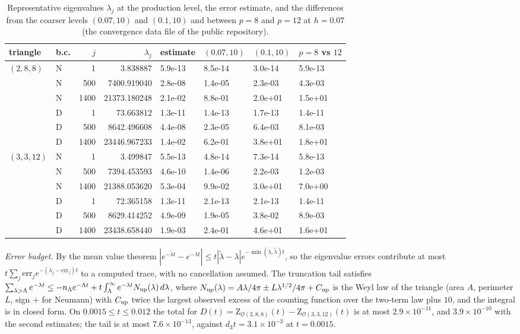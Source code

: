 \documentclass[pdflatex,sn-mathphys-num]{sn-jnl}
\newcommand{\Orb}{\mathcal{O}}
\newcommand{\cZ}{\mathrm{Z}}
\theoremstyle{thmstyleone}%
\theoremstyle{thmstylethree}%
\providecommand{\Orb}{\mathcal{O}}
\providecommand{\cZ}{\mathrm{Z}}
\begin{document}
\begin{table}[ht]
\caption{Representative eigenvalues $\lambda_j$ at the production level, the error estimate, and the differences from the coarser levels $(0.07,10)$ and $(0.1,10)$ and between $p=8$ and $p=12$ at $h=0.07$ (the convergence data file of the public repository).}\label{tab:conv}
\centering\footnotesize
\begin{tabular}{@{}llrrllll@{}}
\toprule
triangle & b.c. & $j$ & $\lambda_j$ & estimate & $(0.07,10)$ & $(0.1,10)$ & $p=8$ vs $12$\\
\midrule
$(2,8,8)$ & N & 1 & 3.838887 & 5.9e-13 & 8.5e-14 & 3.0e-14 & 5.9e-13\\
 & N & 500 & 7400.919040 & 2.8e-08 & 1.4e-05 & 2.3e-03 & 4.3e-03\\
 & N & 1400 & 21373.180248 & 2.1e-02 & 8.8e-01 & 2.0e+01 & 1.5e+01\\
 & D & 1 & 73.663812 & 1.3e-11 & 1.4e-13 & 1.7e-13 & 1.4e-11\\
 & D & 500 & 8642.496608 & 4.4e-08 & 2.3e-05 & 6.4e-03 & 8.1e-03\\
 & D & 1400 & 23446.967233 & 1.4e-02 & 6.2e-01 & 3.8e+01 & 1.8e+01\\
$(3,3,12)$ & N & 1 & 3.499847 & 5.5e-13 & 4.8e-14 & 7.3e-14 & 5.8e-13\\
 & N & 500 & 7394.453593 & 4.6e-10 & 1.4e-06 & 2.2e-03 & 1.2e-03\\
 & N & 1400 & 21388.053620 & 5.3e-04 & 9.9e-02 & 3.0e+01 & 7.0e+00\\
 & D & 1 & 72.365158 & 1.3e-11 & 2.1e-13 & 2.1e-13 & 1.4e-11\\
 & D & 500 & 8629.414252 & 4.9e-09 & 1.9e-05 & 3.8e-02 & 8.9e-03\\
 & D & 1400 & 23438.658440 & 1.9e-03 & 2.4e-01 & 4.6e+01 & 1.6e+01\\
\bottomrule
\end{tabular}
\end{table}

\emph{Error budget.} By the mean value theorem $|e^{-\tilde\lambda t}-e^{-\lambda t}|\le t|\tilde\lambda-\lambda|e^{-\min(\lambda,\tilde\lambda)t}$, so the eigenvalue errors contribute at most $t\sum_j\mathrm{err}_je^{-(\lambda_j-\mathrm{err}_j)t}$ to a computed trace, with no cancellation assumed. The truncation tail satisfies $\sum_{\lambda>\Lambda}e^{-\lambda t}\le-n_\Lambda e^{-\Lambda t}+t\int_\Lambda^\infty e^{-\lambda t}N_{\rm up}(\lambda)\,d\lambda$, where $N_{\rm up}(\lambda)=A\lambda/4\pi\pm L\lambda^{1/2}/4\pi+C_{\rm up}$ is the Weyl law of the triangle (area $A$, perimeter $L$, sign $+$ for Neumann) with $C_{\rm up}$ twice the largest observed excess of the counting function over the two-term law plus $10$, and the integral is in closed form. On $0.0015\le t\le0.012$ the total for $D(t)=\cZ_{\Orb(2,8,8)}(t)-\cZ_{\Orb(3,3,12)}(t)$ is at most $2.9\times10^{-11}$, and $3.9\times10^{-10}$ with the second estimates; the tail is at most $7.6\times10^{-13}$, against $d_3t=3.1\times10^{-3}$ at $t=0.0015$.
\end{document}
